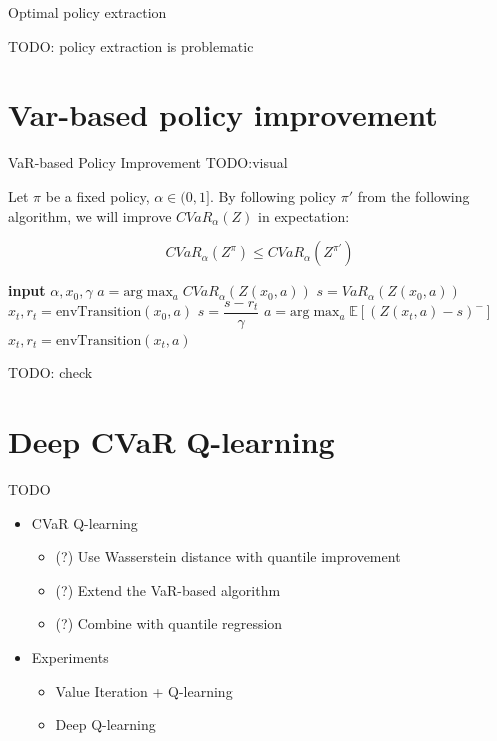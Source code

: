 \documentclass{beamer}
\begin{document}
\begin{frame}{Optimal policy extraction}

TODO: policy extraction is problematic

\end{frame}


\section{Var-based policy improvement}

\begin{frame}{VaR-based Policy Improvement}
TODO:visual
\begin{theorem}
Let $\pi$ be a fixed policy, $\alpha \in (0, 1]$. By following policy $\pi'$ from the following algorithm, we will improve $CVaR_\alpha(Z)$ in expectation:

$$CVaR_\alpha(Z^\pi) \le CVaR_\alpha(Z^{\pi'})$$
\end{theorem}

\begin{algorithmic}
    \STATE \textbf{input} $\alpha, x_0, \gamma$
    \STATE $a = \text{arg}\max_a CVaR_\alpha(Z(x_0, a))$
    \STATE $s = VaR_\alpha(Z(x_0, a))$
    \STATE $x_t, r_t = \text{envTransition}(x_0, a)$
    	\STATE $s = \dfrac{s-r_t}{\gamma}$
    	\STATE $a = \text{arg}\max_a \mathbb{E}\left[(Z(x_t, a)-s)^- \right]$
    	\STATE $x_t, r_t = \text{envTransition}(x_t, a)$
   	\ENDWHILE
\end{algorithmic}
TODO: check
\end{frame}


\section{Deep CVaR Q-learning}

\begin{frame}{TODO}

\begin{itemize}
\item CVaR Q-learning
\begin{itemize}
\item (?) Use Wasserstein distance with quantile improvement
\item (?) Extend the VaR-based algorithm
\item (?) Combine with quantile regression
\end{itemize}

\item Experiments
\begin{itemize}
\item Value Iteration + Q-learning
\item Deep Q-learning
\end{itemize}
\end{itemize}
\end{frame}
\end{document}
